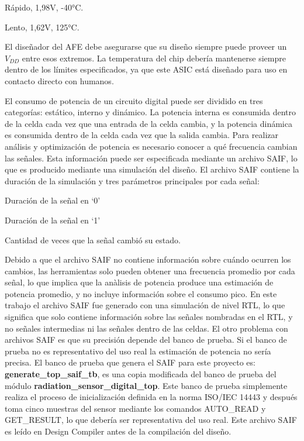 \documentclass[a4paper, twoside, 11pt]{report}
\begin{document}
\begin{description}[labelindent=1cm]
  \item [Best Case:] Rápido, 1,98V, -40°C.
  \item [Worst Case:] Lento, 1,62V, 125°C.
\end{description}

El diseñador del AFE debe asegurarse que su diseño siempre puede proveer un $V_{DD}$ entre esos extremos. La temperatura del chip debería mantenerse siempre dentro de los límites especificados, ya que este ASIC está diseñado para uso en contacto directo con humanos.

El consumo de potencia de un circuito digital puede ser dividido en tres categorías: estático, interno y dinámico. La potencia interna es consumida dentro de la celda cada vez que una entrada de la celda cambia, y la potencia dinámica es consumida dentro de la celda cada vez que la salida cambia. Para realizar análisis y optimización de potencia es necesario conocer a qué frecuencia cambian las señales. Esta información puede ser especificada mediante un archivo SAIF, lo que es producido mediante una simulación del diseño. El archivo SAIF contiene la duración de la simulación y tres parámetros principales por cada señal:

\begin{description}[labelindent=1cm]
  \item [T0:] Duración de la señal en ‘0’
  \item [T1:] Duración de la señal en ‘1’
  \item [TC:] Cantidad de veces que la señal cambió su estado.
\end{description}

Debido a que el archivo SAIF no contiene información sobre cuándo ocurren los cambios, las herramientas solo pueden obtener una frecuencia promedio por cada señal, lo que implica que la anàlisis de potencia produce una estimación de potencia promedio, y no incluye información sobre el consumo pico. En este trabajo el archivo SAIF fue generado con una simulación de nivel RTL, lo que significa que solo contiene información sobre las señales nombradas en el RTL, y no señales intermedias ni las señales dentro de las celdas. El otro problema con archivos SAIF es que su precisión depende del banco de prueba. Si el banco de prueba no es representativo del uso real la estimación de potencia no sería precisa. El banco de prueba que genera el SAIF para este proyecto es: \textbf{generate\_top\_saif\_tb}, es una copia modificada del banco de prueba del módulo \textbf{radiation\_sensor\_digital\_top}. Este banco de prueba simplemente realiza el proceso de inicialización definida en la norma ISO/IEC 14443 y después toma cinco muestras del sensor mediante los comandos AUTO\_READ y GET\_RESULT, lo que debería ser representativa del uso real. Este archivo SAIF es leído en Design Compiler antes de la compilación del diseño.
\end{document}
